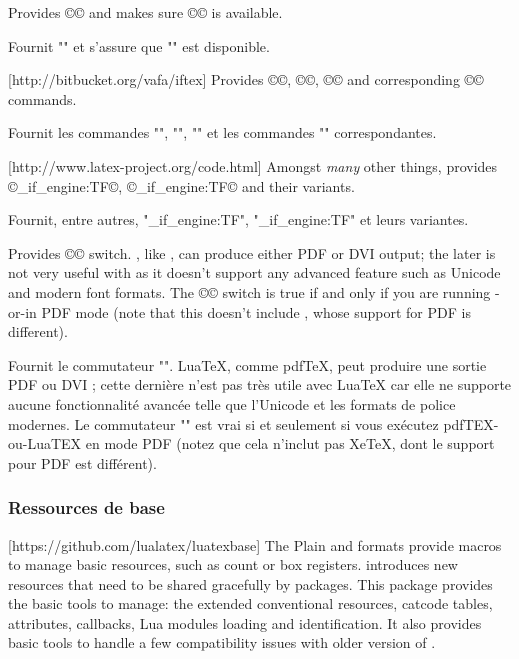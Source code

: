 \documentclass{lltxdoc}
\begin{document}
Provides ©\ifluatex© and makes sure ©\luatexversion© is available.

Fournit "\ifluatex" et s'assure que "\luatexversion" est disponible.

[http://bitbucket.org/vafa/iftex]
Provides ©\ifPDFTeX©, ©\ifXeTeX©, ©\ifLuaTeX© and corresponding ©\Require©
commands.

Fournit les commandes "\ifPDFTeX", "\ifXeTeX", "\ifLuaTeX" et les commandes "\Require" correspondantes.

[http://www.latex-project.org/code.html]
Amongst \emph{many} other things, provides ©\luatex_if_engine:TF©,
©\xetex_if_engine:TF© and their variants.

Fournit, entre autres, "\luatex_if_engine:TF", "\xetex_if_engine:TF" et leurs variantes.

Provides ©\ifpdf© switch. \luatex, like \pdftex, can produce either PDF or DVI
output; the later is not very useful with \luatex as it doesn't support any
advanced feature such as Unicode and modern font formats. The ©\ifpdf© switch
is true if and only if you are running \pdftex-or-\luatex in PDF mode (note
that this doesn't include \xetex, whose support for PDF is different).

Fournit le commutateur "\ifpdf". LuaTeX, comme pdfTeX, peut produire une sortie PDF ou DVI ; cette dernière n'est pas très utile avec LuaTeX car elle ne supporte aucune fonctionnalité avancée telle que l'Unicode et les formats de police modernes. Le commutateur "\ifpdf" est vrai si et seulement si vous exécutez pdfTEX-ou-LuaTEX en mode PDF (notez que cela n'inclut pas XeTeX, dont le support pour PDF est différent).

\subsubsection{Ressources de base}

[https://github.com/lualatex/luatexbase]
The Plain and \latex formats provide macros to manage \tex basic resources,
such as count or box registers. \luatex introduces new resources that need to
be shared gracefully by packages. This package provides the basic tools to
manage: the extended conventional \tex resources, catcode tables, attributes,
callbacks, Lua modules loading and identification. It also provides basic
tools to handle a few compatibility issues with older version of \luatex.
\end{document}
